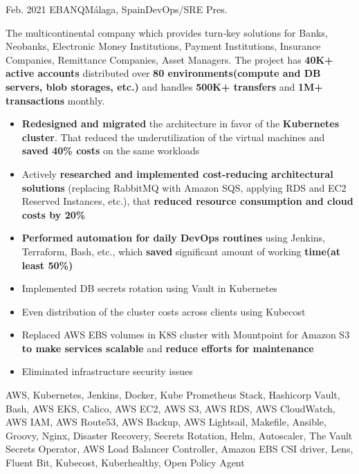 \begin{experiences}
  \experience
    {Feb. 2021} {EBANQ}{Málaga, Spain}{DevOps/SRE}
    {Pres.}
    {
      The multicontinental company which provides turn‑key solutions for Banks, Neobanks, Electronic Money Institutions,
      Payment Institutions, Insurance Companies, Remittance Companies, Asset Managers.
      The project has \textbf{40K+ active accounts} distributed over \textbf{80 environments(compute and DB servers, blob
      storages, etc.)} and handles \textbf{500K+ transfers} and \textbf{1M+ transactions} monthly.
      \begin{itemize}
        \item {\textbf{Redesigned and migrated} the architecture in favor of the \textbf{Kubernetes cluster}.
        That reduced the underutilization of the virtual machines and \textbf{saved 40\% costs} on the same workloads}
        \item {Actively \textbf{researched and implemented cost-reducing architectural solutions} (replacing RabbitMQ with Amazon SQS,
        applying RDS and EC2 Reserved Instances, etc.), that \textbf{reduced resource consumption and cloud costs by 20\%}}
        \item {\textbf{Performed automation for daily DevOps routines} using Jenkins, Terraform, Bash, etc., which \textbf{saved}
        significant amount of working \textbf{time(at least 50\%)}}
        \item {Implemented DB secrets rotation using Vault in Kubernetes}
        \item {Even distribution of the cluster costs across clients using Kubecost}
        \item {Replaced AWS EBS volumes in K8S cluster with Mountpoint for Amazon S3 \textbf{to make services scalable} and \textbf{reduce efforts for maintenance}}
        \item {Eliminated infrastructure security issues}
      \end{itemize}
    }
    {
      AWS, Kubernetes, Jenkins, Docker, Kube Prometheus Stack, Hashicorp Vault, Bash, AWS EKS, Calico, AWS EC2, AWS S3,
      AWS RDS, AWS CloudWatch, AWS IAM, AWS Route53, AWS Backup, AWS Lightsail, Makefile, Ansible, Groovy, Nginx,
      Disaster Recovery, Secrets Rotation, Helm, Autoscaler, The Vault Secrets Operator, AWS Load Balancer Controller,
      Amazon EBS CSI driver, Lens, Fluent Bit, Kubecost, Kuberhealthy, Open Policy Agent
    }
  \emptySeparator


\end{experiences}
